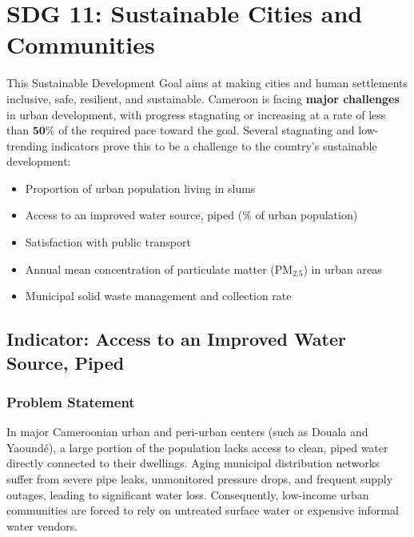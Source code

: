 \documentclass[11pt, a4paper]{article}
\begin{document}
\section{SDG 11: Sustainable Cities and Communities}
This Sustainable Development Goal aims at making cities and human settlements inclusive, safe, resilient, and sustainable. Cameroon is facing \textbf{major challenges} in urban development, with progress stagnating or increasing at a rate of less than $\mathbf{50\%}$ of the required pace toward the goal. Several stagnating and low-trending indicators prove this to be a challenge to the country's sustainable development:

\begin{itemize}
  \item Proportion of urban population living in slums
  \item Access to an improved water source, piped (\% of urban population)
  \item Satisfaction with public transport
  \item Annual mean concentration of particulate matter ($\text{PM}_{2.5}$) in urban areas
  \item Municipal solid waste management and collection rate
\end{itemize}

\subsection{Indicator: Access to an Improved Water Source, Piped}

\subsubsection*{Problem Statement}
In major Cameroonian urban and peri-urban centers (such as Douala and Yaoundé), a large portion of the population lacks access to clean, piped water directly connected to their dwellings. Aging municipal distribution networks suffer from severe pipe leaks, unmonitored pressure drops, and frequent supply outages, leading to significant water loss. Consequently, low-income urban communities are forced to rely on untreated surface water or expensive informal water vendors.
\end{document}
